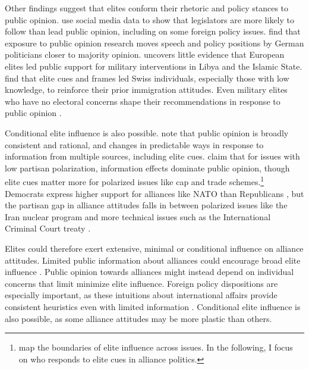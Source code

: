 \documentclass[12pt]{article}
\begin{document}
Other findings suggest that elites conform their rhetoric and policy stances to public opinion. 
\citet{Barberaetal2019} use social media data to show that legislators are more likely to follow than lead public opinion, including on some foreign policy issues. 
\citet{HagerHilbig2020} find that exposure to public opinion research moves speech and policy positions by German politicians closer to majority opinion. 
\citet{Haesebrouck2019} uncovers little evidence that European elites led public support for military interventions in Libya and the Islamic State. 
\citet{Bechteletal2015} find that elite cues and frames led Swiss individuals, especially those with low knowledge, to reinforce their prior immigration attitudes. 
Even military elites who have no electoral concerns shape their recommendations in response to public opinion \citep{LinGreenberg2021}. 


Conditional elite influence is also possible. 
\citet{PageShapiro1992} note that public opinion is broadly consistent and rational, and changes in predictable ways in response to information from multiple sources, including elite cues. 
\citet{GuisingerSaunders2017} claim that for issues with low partisan polarization, information effects dominate public opinion, though elite cues matter more for polarized issues like cap and trade schemes.\footnote{\citet{GuisingerSaunders2017} map the boundaries of elite influence across issues. In the following, I focus on who responds to elite cues in alliance politics.}
Democrats express higher support for alliances like NATO than Republicans \citep{PewNATO2020}, but the partisan gap in alliance attitudes falls in between polarized issues like the Iran nuclear program and more technical issues such as the International Criminal Court treaty \citet{GuisingerSaunders2017}. 


Elites could therefore exert extensive, minimal or conditional influence on alliance attitudes. 
Limited public information about alliances could encourage broad elite influence \citep{Druckman2001}.
Public opinion towards alliances might instead depend on individual concerns that limit minimize elite influence.
Foreign policy dispositions are especially important, as these intuitions about international affairs provide consistent heuristics even with limited information \citep{Herrmannetal2009, KertzerZeitzoff2017}.
Conditional elite influence is also possible, as some alliance attitudes may be more plastic than others.  
\end{document}
